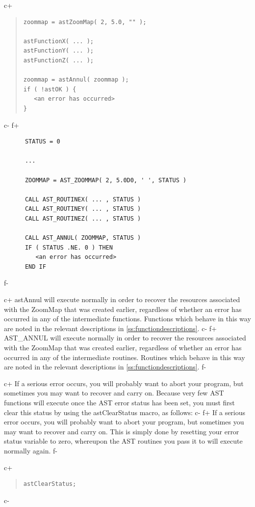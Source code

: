 \documentclass[twoside,11pt]{article}
\newcommand{\appref}[1]{Appendix~\ref{#1}}
\renewcommand{\appref}[1]{\ref{#1}}
\begin{document}
c+
\begin{quote}
\small
\begin{verbatim}
zoommap = astZoomMap( 2, 5.0, "" );

astFunctionX( ... );
astFunctionY( ... );
astFunctionZ( ... );

zoommap = astAnnul( zoommap );
if ( !astOK ) {
   <an error has occurred>
}
\end{verbatim}
\normalsize
\end{quote}
c-
f+
\small
\begin{verbatim}
      STATUS = 0

      ...

      ZOOMMAP = AST_ZOOMMAP( 2, 5.0D0, ' ', STATUS )

      CALL AST_ROUTINEX( ... , STATUS )
      CALL AST_ROUTINEY( ... , STATUS )
      CALL AST_ROUTINEZ( ... , STATUS )

      CALL AST_ANNUL( ZOOMMAP, STATUS )
      IF ( STATUS .NE. 0 ) THEN
         <an error has occurred>
      END IF
\end{verbatim}
\normalsize
f-

c+
astAnnul will execute normally in order to recover the resources
associated with the ZoomMap that was created earlier, regardless of
whether an error has occurred in any of the intermediate functions.
Functions which behave in this way are noted in the relevant
descriptions in \appref{ss:functiondescriptions}.
c-
f+
AST\_ANNUL will execute normally in order to recover the resources
associated with the ZoomMap that was created earlier, regardless of
whether an error has occurred in any of the intermediate routines.
Routines which behave in this way are noted in the relevant
descriptions in \appref{ss:functiondescriptions}.
f-

c+
If a serious error occurs, you will probably want to abort your
program, but sometimes you may want to recover and carry on. Because
very few AST functions will execute once the AST error status has been
set, you must first clear this status by using the astClearStatus
macro, as follows:
c-
f+
If a serious error occurs, you will probably want to abort your
program, but sometimes you may want to recover and carry on.  This is
simply done by resetting your error status variable to zero, whereupon
the AST routines you pass it to will execute normally again.
f-

c+
\begin{quote}
\small
\begin{verbatim}
astClearStatus;
\end{verbatim}
\normalsize
\end{quote}
c-
\end{document}
